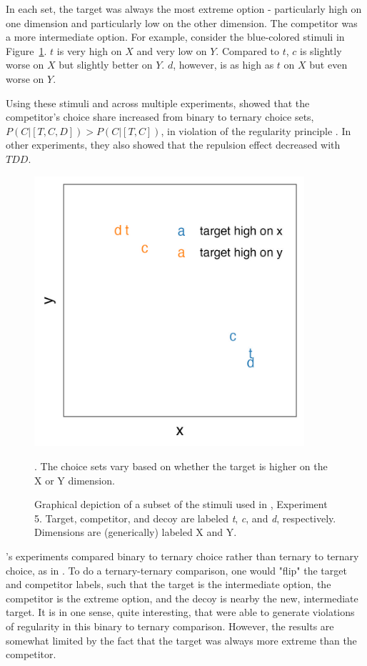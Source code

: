 In each set, the target was always the most extreme option - particularly high on one dimension and particularly low on the other dimension. The competitor was a more intermediate option. For example, consider the blue-colored stimuli in Figure~\ref{fig:banerjee_stim}. $t$ is very high on $X$ and very low on $Y$. Compared to $t$, $c$ is slightly worse on $X$ but slightly better on $Y$. $d$, however, is as high as $t$ on $X$ but even worse on $Y$. 

Using these stimuli and across multiple experiments, \textcite{banerjeeFactorsThatPromote2024} showed that the competitor's choice share increased from binary to ternary choice sets, $P(C|[T,C,D])>P(C|[T,C])$, in violation of the regularity principle \parencite{marley1989random}. In other experiments, they also showed that the repulsion effect decreased with $TDD$.

\begin{figure}
    \includegraphics[width=100mm]{figures/banerjee_stim.jpeg}
    \caption{Graphical depiction of a subset of the stimuli used in \textcite{banerjeeFactorsThatPromote2024}, Experiment 5. Target, competitor, and decoy are labeled \textit{t}, \textit{c}, and \textit{d}, respectively. Dimensions are (generically) labeled X and Y.}. The choice sets vary based on whether the target is higher on the X or Y dimension.
    \label{fig:banerjee_stim}
\end{figure}

\textcite{banerjeeFactorsThatPromote2024}'s experiments compared binary to ternary choice rather than ternary to ternary choice, as in \textcite{spektorWhenGoodLooks2018b}. To do a ternary-ternary comparison, one would "flip" the target and competitor labels, such that the target is the intermediate option, the competitor is the extreme option, and the decoy is nearby the new, intermediate target. It is in one sense, quite interesting, that \textcite{banerjeeFactorsThatPromote2024} were able to generate violations of regularity in this binary to ternary comparison. However, the results are somewhat limited by the fact that the target was always more extreme than the competitor.

